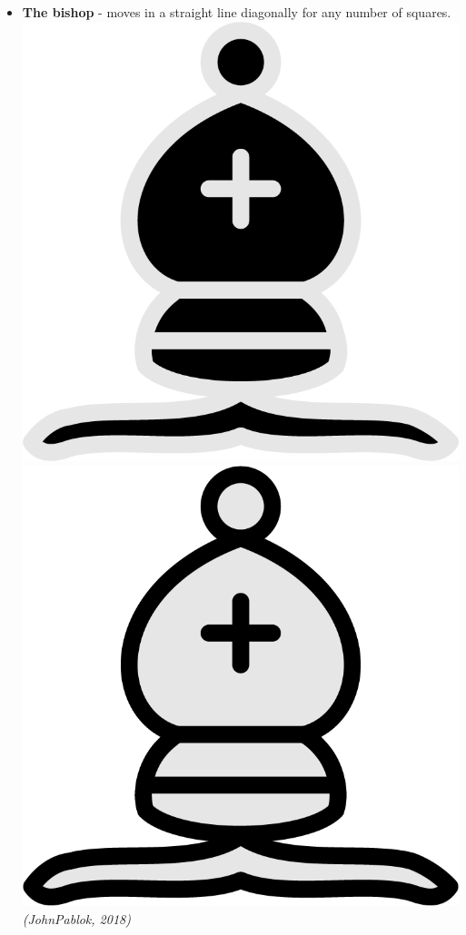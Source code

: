 \documentclass{article}
\begin{document}
\begin{itemize}
    \item \textbf{The bishop} - moves in a straight line diagonally for any number of squares.\\
    \includegraphics[scale=0.1]{image1.png}
    \includegraphics[scale=0.1]{image16.png}
    \textit{(JohnPablok, 2018)}
    

\end{itemize}
\end{document}
